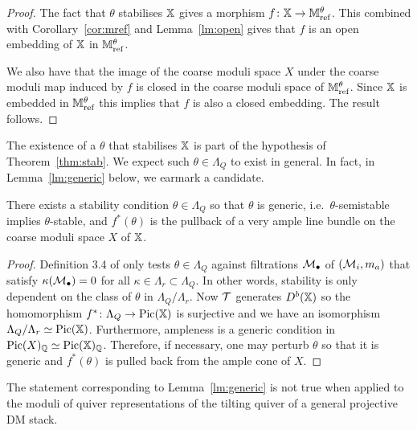 \documentclass[12pt]{amsart}
\begin{document}
\begin{proof}
The fact that $\theta$ stabilises $\mathbb{X}$ gives a morphism $f \colon \mathbb{X} \rightarrow \mathbb{M}_{\text{ref}}^\theta$.
This combined with Corollary~\ref{cor:mref} and Lemma~\ref{lm:open} gives that $f$ is an open embedding of $\mathbb{X}$ in $\mathbb{M}_{\text{ref}}^\theta$.

We also have that the image of the coarse moduli space $X$ under the coarse moduli map induced by $f$ is closed in the coarse moduli space of $\mathbb{M}_\text{ref}^\theta$. 
Since $\mathbb{X}$ is embedded in $\mathbb{M}_\text{ref}^\theta$ this implies that $f$ is also a closed embedding.
The result follows.
\end{proof}

\begin{remark}
The existence of a $\theta$ that stabilises $\mathbb{X}$ is part of the hypothesis of Theorem~\ref{thm:stab}.
We expect such $\theta \in \Lambda_Q$ to exist in general.
In fact, in Lemma~\ref{lm:generic} below, we earmark a candidate.
\end{remark}

\begin{lemma}\label{lm:generic}
There exists a stability condition $\theta \in \Lambda_Q$ so that $\theta$ is generic, i.e.\ $\theta$-semistable implies $\theta$-stable, and $f^*(\theta)$ is the pullback of a very ample line bundle on the coarse moduli space $X$ of $\mathbb{X}$.
\end{lemma}

\begin{proof}
Definition 3.4 of \cite{Abd} only tests $\theta \in \Lambda_{Q}$ against filtrations $\mathcal{M}_\bullet$ of $(\mathcal{M}_i, m_a)$ that satisfy $\kappa(\mathcal{M}_\bullet)=0$ for all $\kappa\in \Lambda_r \subset \Lambda_{Q}$.
In other words, stability is only dependent on the class of $\theta$ in $\Lambda_{Q}/\Lambda_r$.
Now $\mathcal{T}$ generates $D^b(\mathbb{X})$ so the homomorphism $f^*\colon \Lambda_{Q} \rightarrow \operatorname{Pic}(\mathbb{X})$ is surjective and we have an isomorphism $\Lambda_{Q}/\Lambda_r \simeq \operatorname{Pic}(\mathbb{X})$.
Furthermore, ampleness is a generic condition in $\operatorname{Pic}(X)_{\mathbb{Q}} \simeq \operatorname{Pic}(\mathbb{X})_{\mathbb{Q}}$.
Therefore, if necessary, one may perturb $\theta$ so that it is generic and $f^*(\theta)$ is pulled back from the ample cone of $X$.
\end{proof}

\begin{remark}\label{rm:generic}
The statement corresponding to Lemma~\ref{lm:generic} is not true when applied to the moduli of quiver representations of the tilting quiver of a general projective DM stack.
\end{remark}
\end{document}
